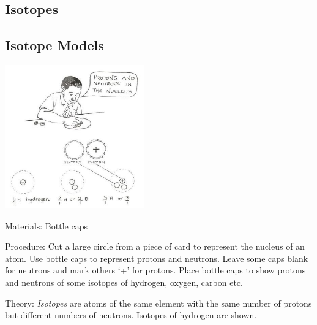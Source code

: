 \begin{multicols}{2}

\section*{Isotopes} 


\subsection{Isotope Models}

\begin{center}
\includegraphics[width=0.45\textwidth]{./img/source/isotopes.jpg}
\end{center}

\begin{description*}
\item[Materials:]{Bottle caps}
\item[Procedure:]{Cut a large
circle from a piece of card to represent
the nucleus of an atom. Use bottle caps to represent protons and
neutrons. Leave some caps blank
for neutrons and mark others `+' for protons.
Place bottle caps to show protons and neutrons of some
isotopes of hydrogen, oxygen, carbon etc.}
\item[Theory:]{\emph{Isotopes} are atoms of the same element with the same number of protons but different numbers of neutrons. Isotopes of hydrogen are shown.}
\end{description*}



\end{multicols}

\pagebreak